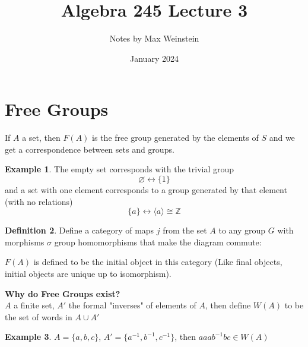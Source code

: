 \documentclass{amsart}
\title{Algebra 245 Lecture 3}
\author{Notes by Max Weinstein}
\date{January 2024}
\begin{document}
\theoremstyle{plain}                    
\newtheorem{theorem}{Theorem}[section]
\newtheorem{lemma}[theorem]{Lemma}
\newtheorem{proposition}[theorem]{Proposition}
\newtheorem{corollary}[theorem]{Corollary} 

\theoremstyle{definition}
\newtheorem{definition}[theorem]{Definition}
\newtheorem{example}[theorem]{Example}
\newtheorem{remark}[theorem]{Remark}


\newcommand{\nn}{\mathbb N}
\newcommand{\zz}{\mathbb Z}
\newcommand{\qq}{\mathbb Q}
\newcommand{\rr}{\mathbb R}
\newcommand{\cc}{\mathbb C}
\newcommand{\dd}{\mathbb D} 
\newcommand{\ff}{\mathbb F} 




\maketitle

\section{\textbf{Free Groups}}

If $A$ a set, then $F(A)$ is the free group generated by the elements of $S$ and we get a correspondence between sets and groups.\\
\begin{example}
    The empty set corresponds with the trivial group $$\varnothing \longleftrightarrow \{1\}$$ and a set with one element corresponds to a group generated by that element (with no relations) $$\{a\} \longleftrightarrow \langle a\rangle \cong \mathbb{Z}$$
\end{example}
\hfill
\begin{definition}
Define a category of maps $j$ from the set $A$ to any group $G$ with morphisms $\sigma$ group homomorphisms that make the diagram commute:
    \begin{center}
\end{center}
$F(A)$ is defined to be the initial object in this category (Like final objects, initial objects are unique up to isomorphism).


\end{definition}
\hfill

\textbf{Why do Free Groups exist?}\\
$A$ a finite set, $A'$ the formal "inverses" of elements of $A$, then define $W(A)$ to be the set of words in $A\cup A'$
\begin{example}
    $A = \{a,b,c\}$, $A'=\{a^{-1}, b^{-1}, c^{-1}\}$, then $aaab^{-1}bc \in W(A)$
\end{example}
\end{document}
